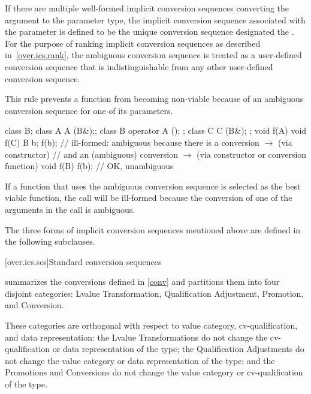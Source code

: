 \pnum
If there are multiple well-formed implicit conversion sequences
converting the argument to the parameter type, the implicit
conversion sequence associated with the parameter is defined to be
the unique conversion sequence designated the
.
For the purpose of ranking implicit conversion sequences as described
in~\ref{over.ics.rank}, the ambiguous conversion sequence is treated
as a user-defined conversion sequence that is indistinguishable from any
other user-defined conversion sequence.
\begin{note}
This rule prevents a function from becoming non-viable because of an ambiguous
conversion sequence for one of its parameters.
\begin{example}
\begin{codeblock}
class B;
class A { A (B&);};
class B { operator A (); };
class C { C (B&); };
void f(A) { }
void f(C) { }
B b;
f(b);               // ill-formed: ambiguous because there is a conversion  $\to$  (via constructor)
                    // and an (ambiguous) conversion  $\to$  (via constructor or conversion function)
void f(B) { }
f(b);               // OK, unambiguous
\end{codeblock}
\end{example}
\end{note}
If a function that uses the ambiguous conversion sequence is selected
as the best viable function, the call will be ill-formed because the conversion
of one of the arguments in the call is ambiguous.

\pnum
The three forms of implicit conversion sequences mentioned above
are defined in the following subclauses.

[over.ics.scs]{Standard conversion sequences}

\pnum
{}
summarizes the conversions defined in \ref{conv} and
partitions them into four disjoint categories: Lvalue Transformation,
Qualification Adjustment, Promotion, and Conversion.
\begin{note}
These categories are orthogonal with respect to value category,
cv-qualification, and data representation: the Lvalue Transformations
do not change the cv-qualification or data
representation of the type; the Qualification Adjustments do not
change the value category or data representation of the type; and
the Promotions and Conversions do not change the
value category or cv-qualification of the type.
\end{note}

